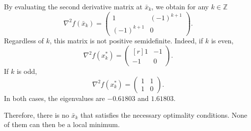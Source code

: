 By evaluating the second derivative matrix at $\bar{x}_k$, we obtain for any $k \in
\mathbb{Z}$
\[
\nabla^2 f(\bar{x}_k)= \begin{pmatrix*} 1 & (-1)^{k+1} \\(-1)^{k+1} &
  0 \end{pmatrix*}.
\]
Regardless of $k$, this matrix is not positive semidefinite.
Indeed, if $k$ is even,
\[
\nabla^2 f(x_k^*)= \begin{pmatrix*}[r] 1 & -1 \\-1 &  0 \end{pmatrix*}.
\]
If $k$ is odd,
\[
\nabla^2 f(x_k^*)= \begin{pmatrix*} 1 & 1 \\1 &  0 \end{pmatrix*}.
\]
In both cases, the eigenvalues are $-0.61803$ and $1.61803$.


Therefore, there is no $\bar{x}_k$ that satisfies the necessary optimality conditions. None of them can then be a local minimum.

